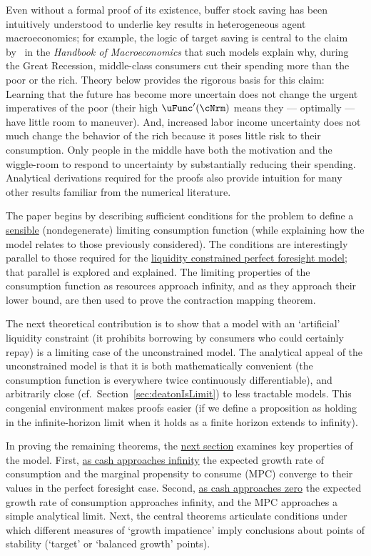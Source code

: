 \documentclass[BufferStockTheory]{subfiles}
\begin{document}
\hypertarget{KMP}{} Even without a formal proof of its existence, buffer stock saving has been intuitively understood to underlie key results in heterogeneous agent macroeconomics; for example, the logic of target saving is central to the claim by~\cite{kmpHandbook} in the \textit{Handbook of Macroeconomics} that such models explain why, during the Great Recession, middle-class consumers cut their spending more than the poor or the rich.  Theory below provides the rigorous basis for this claim:  Learning that the future has become more uncertain does not change the urgent imperatives of the poor (their high $\uFunc^{\prime}(\cNrm)$ means they --- optimally --- have little room to maneuver).  And, increased labor income uncertainty does not much change the behavior of the rich because it poses little risk to their consumption.  Only people in the middle have both the motivation and the wiggle-room to respond to uncertainty by substantially reducing their spending.  Analytical derivations required for the proofs also provide intuition for many other results familiar from the numerical literature.

The paper begins by describing sufficient conditions for the problem to define a \hyperlink{sensible}{sensible} (nondegenerate) limiting consumption function (while explaining how the model relates to those previously considered).  The conditions are interestingly parallel to those required for the \hyperlink{Factors-Defined-And-Compared}{liquidity constrained perfect foresight model}; that parallel is explored and explained.  The limiting properties of the consumption function as resources approach infinity, and as they approach their lower bound, are then used to prove the contraction mapping theorem.

The next theoretical contribution is to show that a model with an `artificial' liquidity constraint (it prohibits borrowing by consumers who could certainly repay) is a limiting case of the unconstrained model.  The analytical appeal of the unconstrained model is that it is both mathematically convenient (the consumption function is everywhere twice continuously differentiable), and arbitrarily close (cf.\ Section~\ref{sec:deatonIsLimit}) to less tractable models. This congenial environment makes proofs easier (if we define a proposition as holding in the infinite-horizon limit when it holds as a finite horizon extends to infinity).

In proving the remaining theorems, the \hyperlink{AnalysisoftheConvergedConsumptionFunction}{next section} examines key properties of the model. First, \hyperlink{LimitsAsmtToInfty}{as cash approaches infinity} the expected growth rate of consumption and the marginal propensity to consume (MPC) converge to their values in the perfect foresight case. Second, \hyperlink{LimitsAsmtToZero}{as cash approaches zero} the expected growth rate of consumption approaches infinity, and the MPC approaches a simple analytical limit.  Next, the central theorems articulate conditions under which different measures of `growth impatience' imply conclusions about points of stability (`target' or `balanced growth' points).
\end{document}
